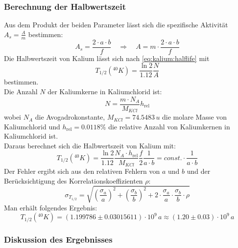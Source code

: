 \subsubsection{Berechnung der Halbwertszeit}
Aus dem Produkt der beiden Parameter lässt sich die spezifische Aktivität $A_s = \frac{A}{m}$ bestimmen:
\begin{equation}
  A_s = \frac{2 \cdot a \cdot b}{f} \quad \Rightarrow \quad A = m \cdot \frac{2 \cdot a \cdot b}{f}
\end{equation}
Die Halbwertszeit von Kalium lässt sich nach \eqref{eq:kalium:halflife} mit %
\begin{equation}
  T_{1/2}({}^{40}K) = \frac{\ln 2}{1.12} \frac{N}{A}
\end{equation}
bestimmen. \\
Die Anzahl $N$ der Kaliumkerne in Kaliumchlorid ist:
\begin{equation}
  N = \frac{m \cdot N_A}{M_{KCl}} h_{\text{rel}}
\end{equation}
wobei $N_A$ die Avogadrokonstante, $M_{KCl}=74.5483\,u$ die molare Masse von Kaliumchlorid und $h_{\text{rel}}=0.0118\%$ die relative Anzahl von Kaliumkernen 
in Kaliumchlorid ist. \\
Daraus berechnet sich die Halbwertszeit von Kalium mit:
\begin{equation}
  T_{1/2} \left( {}^{40} K \right)  = \frac{\ln 2}{1.12} \frac{N_A \cdot h_{\text{rel}}}{M_{KCl}} \frac{f}{2} \frac{1}{a \cdot b} = const. \cdot \frac{1}{a \cdot b}
\end{equation}
Der Fehler ergibt sich aus den relativen Fehlern von $a$ und $b$ und der Berücksichtigung des Korrelationskoeffizienten $\rho$:
\begin{equation}
  \sigma_{T_{1/2}} = \sqrt{ \left( \frac{\sigma_a}{a} \right)^2 + \left( \frac{\sigma_b}{b} \right)^2 + 2 \cdot \frac{\sigma_a}{a} \cdot \frac{\sigma_b}{b} \cdot \rho   }
\end{equation}
Man erhält folgendes Ergebnis:
\begin{equation}
  T_{1/2} \left( {}^{40} K \right) = (1.199786 \pm 0.03015611) \cdot 10^9\,a \approx (1.20 \pm 0.03) \cdot 10^9\,a  
\end{equation}

\subsubsection{Diskussion des Ergebnisses}

